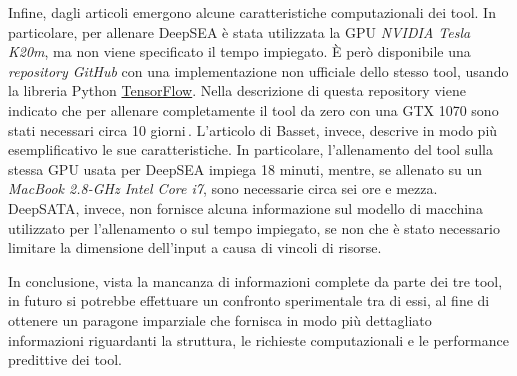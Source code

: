 Infine, dagli articoli emergono alcune caratteristiche computazionali dei tool. In particolare, per allenare DeepSEA è stata utilizzata la \acs{GPU} \textsl{NVIDIA Tesla K20m}, ma non viene specificato il tempo impiegato. È però disponibile una \textsl{repository GitHub} con una implementazione non ufficiale dello stesso tool, usando la libreria Python \href{https://www.tensorflow.org}{TensorFlow}. Nella descrizione di questa repository viene indicato che per allenare completamente il tool da zero con una GTX 1070 sono stati necessari circa 10 giorni\,\cite{deepseagithub}. L'articolo di Basset, invece, descrive in modo più esemplificativo le sue caratteristiche. In particolare, l'allenamento del tool sulla stessa \acs{GPU} usata per DeepSEA impiega 18 minuti, mentre, se allenato su un \textsl{MacBook 2.8-GHz Intel Core i7}, sono necessarie circa sei ore e mezza. DeepSATA, invece, non fornisce alcuna informazione sul modello di macchina utilizzato per l'allenamento o sul tempo impiegato, se non che è stato necessario limitare la dimensione dell'input a causa di vincoli di risorse.

In conclusione, vista la mancanza di informazioni complete da parte dei tre tool, in futuro si potrebbe effettuare un confronto sperimentale tra di essi, al fine di ottenere un paragone imparziale che fornisca in modo più dettagliato informazioni riguardanti la struttura, le richieste computazionali e le performance predittive dei tool.
